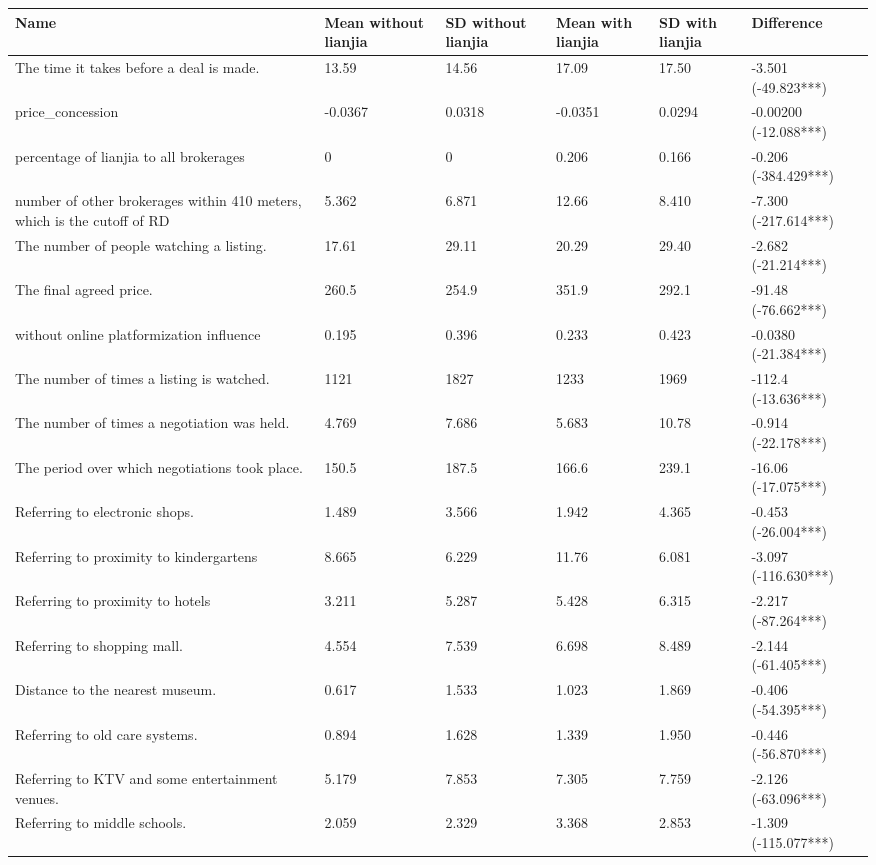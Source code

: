 \begin{tabular}{p{5cm}lllll}
\toprule
Name & Mean without lianjia & SD without lianjia & Mean with lianjia & SD with lianjia & Difference \\
\midrule
The time it takes before a deal is made. & 13.59 & 14.56 & 17.09 & 17.50 & -3.501 (-49.823***) \\
price\_concession & -0.0367 & 0.0318 & -0.0351 & 0.0294 & -0.00200 (-12.088***) \\
percentage of lianjia to all brokerages & 0 & 0 & 0.206 & 0.166 & -0.206 (-384.429***) \\
number of other brokerages within 410 meters, which is the cutoff of RD & 5.362 & 6.871 & 12.66 & 8.410 & -7.300 (-217.614***) \\
The number of people watching a listing. & 17.61 & 29.11 & 20.29 & 29.40 & -2.682 (-21.214***) \\
The final agreed price. & 260.5 & 254.9 & 351.9 & 292.1 & -91.48 (-76.662***) \\
without online platformization influence & 0.195 & 0.396 & 0.233 & 0.423 & -0.0380 (-21.384***) \\
The number of times a listing is watched. & 1121 & 1827 & 1233 & 1969 & -112.4 (-13.636***) \\
The number of times a negotiation was held. & 4.769 & 7.686 & 5.683 & 10.78 & -0.914 (-22.178***) \\
The period over which negotiations took place. & 150.5 & 187.5 & 166.6 & 239.1 & -16.06 (-17.075***) \\
Referring to electronic shops. & 1.489 & 3.566 & 1.942 & 4.365 & -0.453 (-26.004***) \\
Referring to proximity to kindergartens & 8.665 & 6.229 & 11.76 & 6.081 & -3.097 (-116.630***) \\
Referring to proximity to hotels & 3.211 & 5.287 & 5.428 & 6.315 & -2.217 (-87.264***) \\
Referring to shopping mall. & 4.554 & 7.539 & 6.698 & 8.489 & -2.144 (-61.405***) \\
Distance to the nearest museum. & 0.617 & 1.533 & 1.023 & 1.869 & -0.406 (-54.395***) \\
Referring to old care systems. & 0.894 & 1.628 & 1.339 & 1.950 & -0.446 (-56.870***) \\
Referring to KTV and some entertainment venues. & 5.179 & 7.853 & 7.305 & 7.759 & -2.126 (-63.096***) \\
Referring to middle schools. & 2.059 & 2.329 & 3.368 & 2.853 & -1.309 (-115.077***) \\

\end{tabular}
